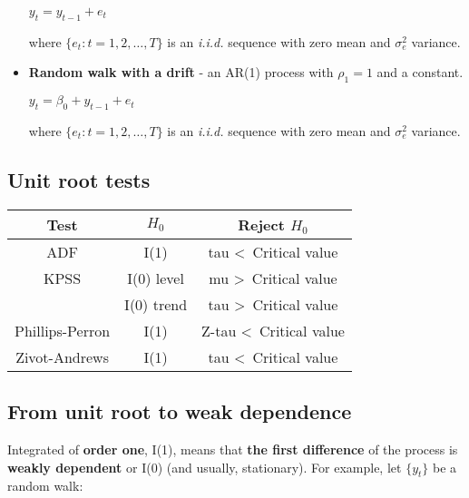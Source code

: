 \documentclass[10pt, a4paper, landscape]{article}
\begin{document}
\begin{multicols}{3}
\begin{itemize}[leftmargin=*]
			\begin{center}
				$y_{t} = y_{t - 1} + e_{t}$
			\end{center}
			
			where $\lbrace e_{t} : t = 1, 2, \ldots, T \rbrace$ is an \textsl{i.i.d.} sequence with zero mean and $\sigma^{2}_{e}$ variance.
			
			\item \textbf{Random walk with a drift} - an AR(1) process with $\rho_{1} = 1$ and a constant.
			
			\begin{center}
				$y_{t} = \beta_{0} + y_{t - 1} + e_{t}$
			\end{center}
			
			where $\lbrace e_{t} : t = 1, 2, \ldots, T \rbrace$ is an \textsl{i.i.d.} sequence with zero mean and $\sigma^{2}_{e}$ variance.
		\end{itemize}
		
		\subsection*{Unit root tests}
		
		\begin{center}
			\begin{tabular}{ c | c | c }
				Test            & $H_{0}$    & Reject $H_{0}$                     \\ \hline
				ADF             & I(1)       & tau \textless \, Critical value    \\ \hline
				KPSS            & I(0) level & mu \textgreater \, Critical value  \\
				                & I(0) trend & tau \textgreater \, Critical value \\ \hline
				Phillips-Perron & I(1)       & Z-tau \textless \, Critical value  \\ \hline
				Zivot-Andrews   & I(1)       & tau \textless \, Critical value
			\end{tabular}
		\end{center}
		
		\subsection*{From unit root to weak dependence}
		
		Integrated of \textbf{order one}, I(1), means that \textbf{the first difference} of the process is \textbf{weakly dependent} or I(0) (and usually, stationary). For example, let $\lbrace y_{t} \rbrace$ be a random walk:
		

\end{multicols}
\end{document}
